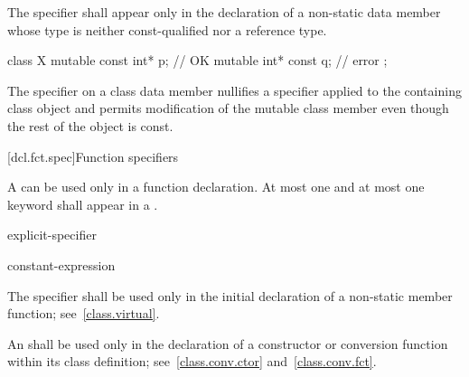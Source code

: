 \pnum
The  specifier shall appear only in the declaration of
a non-static data member
whose type is neither const-qualified nor a reference type.
\begin{example}
\begin{codeblock}
class X {
  mutable const int* p;         // OK
  mutable int* const q;         // error
};
\end{codeblock}
\end{example}

\pnum
\begin{note}
The  specifier on a class data member nullifies a
 specifier applied to the containing class object and
permits modification of the mutable class member even though the rest of
the object is const.
\end{note}

[dcl.fct.spec]{Function specifiers}%
%

\pnum
A
can be used only in a function declaration.
At most one  and
at most one  keyword shall appear in
a .

\begin{bnf}
\br
    \br
    explicit-specifier
\end{bnf}

\begin{bnf}
\br
     \terminal{(} constant-expression \terminal{)}\br
\end{bnf}

\pnum
{}%
The  specifier shall be used only in the initial
declaration of a non-static member function; see~\ref{class.virtual}.

\pnum
{}%
An  shall be used only in the declaration of
a constructor or conversion function within its class definition;
see~\ref{class.conv.ctor} and~\ref{class.conv.fct}.

